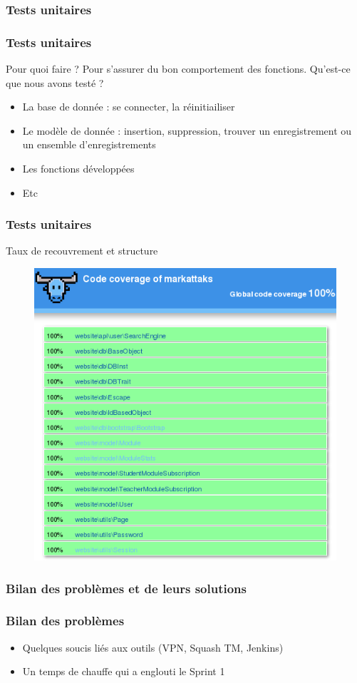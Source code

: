 \documentclass{beamer}
\begin{document}
      \subsubsection{Tests unitaires}
      \begin{frame}
        \frametitle{Tests unitaires}
        \begin{block}{Pour quoi faire ?}
          Pour s'assurer du bon comportement des fonctions. Qu'est-ce que nous avons testé ?
          \begin{itemize}
            \item La base de donnée : se connecter, la réinitiailiser
            \item Le modèle de donnée : insertion, suppression, trouver un enregistrement ou un ensemble d'enregistrements
            \item Les fonctions développées
            \item Etc
          \end{itemize}
        \end{block}
      \end{frame}
      \begin{frame}
        \frametitle{Tests unitaires}
        \begin{block}{Taux de recouvrement et structure}
          \begin{figure}
            \begin{center}
              \includegraphics[width=.5\textwidth]{images/atoum.png}
              \label{fig:cov_tu}
            \end{center}
          \end{figure}
        \end{block}
      \end{frame}
      
      \subsubsection{Bilan des problèmes et de leurs solutions}
      \begin{frame}
        \frametitle{Bilan des problèmes}
        \begin{block}{}
          \begin{itemize}
            \item Quelques soucis liés aux outils (VPN, Squash TM, Jenkins)
            \item Un temps de chauffe qui a englouti le Sprint 1
          \end{itemize}
        \end{block}
      \end{frame}
      
\end{document}
